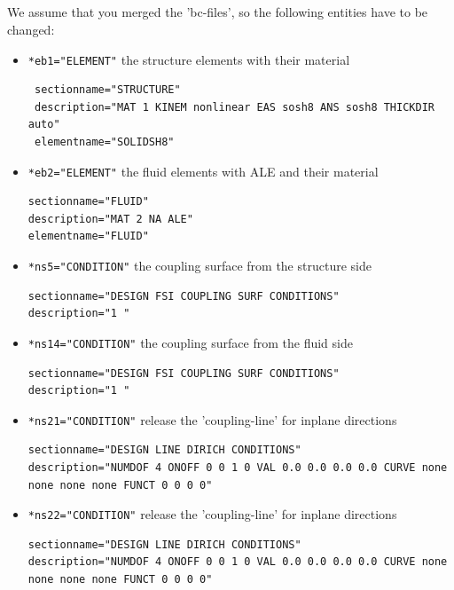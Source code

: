 \subsection{\bc}
We assume that you merged the 'bc-files', so the following entities have to be changed:

\begin{itemize}
 \item \verb|*eb1="ELEMENT"| \qquad the structure elements with their material
 \begin{small} \begin{verbatim}
 sectionname="STRUCTURE"
 description="MAT 1 KINEM nonlinear EAS sosh8 ANS sosh8 THICKDIR auto"
 elementname="SOLIDSH8"
 \end{verbatim} \end{small}
 
 \item \verb|*eb2="ELEMENT"| \qquad the fluid elements with ALE and their material
 \begin{small} \begin{verbatim}
sectionname="FLUID"
description="MAT 2 NA ALE"
elementname="FLUID"
\end{verbatim} \end{small}

\item \verb|*ns5="CONDITION"|  \qquad the coupling surface from the structure side
\begin{small} \begin{verbatim}
sectionname="DESIGN FSI COUPLING SURF CONDITIONS"
description="1 "
 \end{verbatim} \end{small}
 
\item \verb|*ns14="CONDITION"| \qquad the coupling surface from the fluid side
\begin{small} \begin{verbatim}
sectionname="DESIGN FSI COUPLING SURF CONDITIONS"
description="1 "
 \end{verbatim} \end{small}
 
\item \verb|*ns21="CONDITION"| \qquad release the 'coupling-line' for inplane directions
\begin{small} \begin{verbatim}
sectionname="DESIGN LINE DIRICH CONDITIONS"
description="NUMDOF 4 ONOFF 0 0 1 0 VAL 0.0 0.0 0.0 0.0 CURVE none none none none FUNCT 0 0 0 0"
 \end{verbatim} \end{small}
 
\item \verb|*ns22="CONDITION"| \qquad release the 'coupling-line' for inplane directions
\begin{small} \begin{verbatim}
sectionname="DESIGN LINE DIRICH CONDITIONS"
description="NUMDOF 4 ONOFF 0 0 1 0 VAL 0.0 0.0 0.0 0.0 CURVE none none none none FUNCT 0 0 0 0"
 \end{verbatim} \end{small}
\end{itemize}

